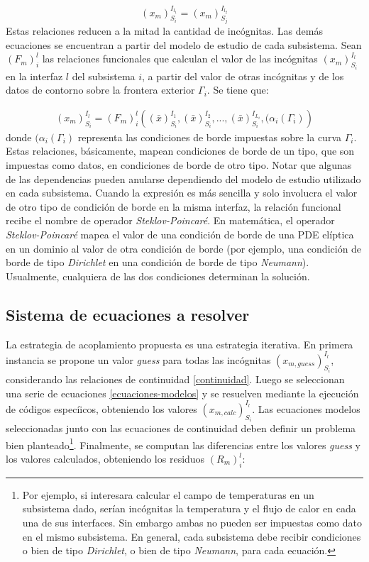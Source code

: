 \begin{equation}
{(x_m)_{S_i}^{I_{l_1}}}={(x_m)_{S_j}^{I_{l_2}}}
\label{continuidad}
\end{equation}
Estas relaciones reducen a la mitad la cantidad de incógnitas.
Las demás ecuaciones se encuentran a partir del modelo de estudio de cada subsistema. 
Sean $(F_m)_{i}^{l}$ las relaciones funcionales que calculan el valor de las incógnitas ${(x_m)_{S_i}^{I_l}}$ en la interfaz $l$ del subsistema $i$,
a partir del valor de otras incógnitas y de los datos de contorno sobre la frontera exterior $\Gamma_i$. Se tiene que:

\begin{equation}
\begin{split}
  (x_m)_{S_i}^{I_l} = (F_m)_{i}^{l} \left ( (\bar{x})_{S_i}^{I_1}, (\bar{x})_{S_i}^{I_2}, ..., 
  (\bar{x})_{S_i}^{I_{L_i}}, (\alpha_i({\Gamma_i}) \right )
\end{split}
\label{ecuaciones-modelos}
\end{equation}
donde $(\alpha_i({\Gamma_i})$ representa las condiciones de borde impuestas sobre la curva $\Gamma_i$.
Estas relaciones, básicamente, mapean condiciones de borde de un tipo, que son impuestas como datos, en condiciones de borde de otro tipo.
Notar que algunas de las dependencias pueden anularse dependiendo del modelo de estudio utilizado en cada subsistema.
Cuando la expresión es más sencilla y solo involucra el valor de otro tipo de condición de borde en la misma interfaz,
la relación funcional recibe el nombre de operador \textit{Steklov-Poincaré}.
En matemática, el operador \textit{Steklov-Poincaré} mapea el valor de una condición de borde de una PDE elíptica en un dominio al valor
de otra condición de borde (por ejemplo, una condición de borde de tipo \textit{Dirichlet} en una condición de borde de tipo \textit{Neumann}).
Usualmente, cualquiera de las dos condiciones determinan la solución.

\subsection*{Sistema de ecuaciones a resolver}
\label{1:ecuaciones}
La estrategia de acoplamiento propuesta es una estrategia iterativa.
En primera instancia se propone un valor \textit{guess} para todas las incógnitas $(x_{m,guess})_{S_i}^{I_l}$, considerando las relaciones de continuidad \ref{continuidad}. 
Luego se seleccionan una serie de ecuaciones \ref{ecuaciones-modelos}
y se resuelven mediante la ejecución de códigos especíicos, obteniendo los valores $(x_{m,calc})_{S_i}^{I_l}$.
Las ecuaciones modelos seleccionadas junto con las ecuaciones de continuidad deben definir un problema bien planteado\footnote{
Por ejemplo, si interesara calcular el campo de temperaturas en un subsistema dado,
serían incógnitas la temperatura y el flujo de calor en cada una de sus interfaces.
Sin embargo ambas no pueden ser impuestas como dato en el mismo subsistema.
En general, cada subsistema debe recibir condiciones o bien de tipo \textit{Dirichlet}, o bien de tipo \textit{Neumann}, para cada ecuación.
}.
Finalmente, se computan las diferencias entre los valores \textit{guess} y los valores calculados, obteniendo los residuos $(R_m)_{i}^{l}$:

